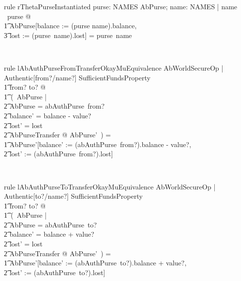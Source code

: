 \begin{LRRT}
\begin{theorem}{rule rThetaPurseInstantiated}
  \forall purse: NAMES \ffun AbPurse; name: NAMES | name \in  \dom~purse @ \\
      \t1 \theta AbPurse[balance := (purse name).balance, \\
            \t3 lost := (purse~name).lost] = purse~name
\end{theorem}~\end{LRRT}

\begin{LRRT}
\begin{theorem}{rule lAbAuthPurseFromTransferOkayMuEquivalence}
    \forall  AbWorldSecureOp | Authentic[from?/name?] \land  SufficientFundsProperty \\
        \t1 \land from? \neq to? @ \\
        \t1\ (~\mu \Delta AbPurse | \\
            \t2 \theta  AbPurse = abAuthPurse~from? \land  \\
            \t2 balance' = balance - value? \land  \\
            \t2 lost' = lost \land  \\
            \t2 \Xi AbPurseTransfer @ \theta  AbPurse'~) = \\
        \t1 \theta AbPurse'[balance' := (abAuthPurse~from?).balance - value?, \\
            \t2 lost' := (abAuthPurse~from?).lost]
\end{theorem}~\end{LRRT}

\begin{LRRT}
\begin{theorem}{rule lAbAuthPurseToTransferOkayMuEquivalence}
    \forall  AbWorldSecureOp | Authentic[to?/name?] \land SufficientFundsProperty \\
        \t1 \land from? \neq  to? @ \\
        \t1\ (~\mu  \Delta AbPurse | \\
            \t2 \theta  AbPurse = abAuthPurse~to? \land \\
            \t2 balance' = balance + value? \land  \\
            \t2 lost' = lost \land  \\
            \t2 \Xi AbPurseTransfer @ \theta  AbPurse'~) = \\
        \t1 \theta AbPurse'[balance' := (abAuthPurse~to?).balance + value?, \\
            \t2 lost' := (abAuthPurse~to?).lost]
\end{theorem}~\end{LRRT}

